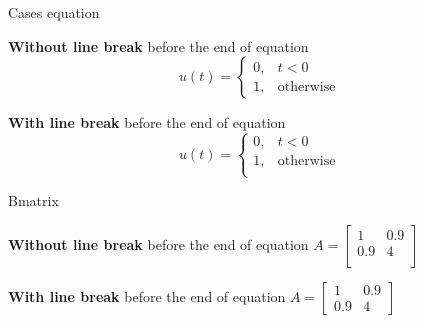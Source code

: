 \documentclass{article}
\begin{document}
Cases equation

\textbf{Without line break} before the end of equation
    \begin{equation}
        u(t)=\begin{cases}
			0, & t < 0 \\
            1, & \text{otherwise}
		 \end{cases}
    \end{equation}

\textbf{With line break} before the end of equation
    \begin{equation}
        u(t)=\begin{cases}
			0, & t < 0 \\
            1, & \text{otherwise} \\
		 \end{cases}
    \end{equation}

    
Bmatrix

\textbf{Without line break} before the end of equation
$A =
    \begin{bmatrix}
    1 & 0.9 \\
    0.9 & 4 \\
    \end{bmatrix}
$

\textbf{With line break} before the end of equation
$A =
    \begin{bmatrix}
    1 & 0.9 \\
    0.9 & 4
    \end{bmatrix}
$
\end{document}
